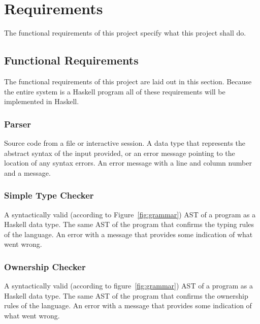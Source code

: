 \chapter{Requirements}\label{sec:reqs}
The functional requirements of this project specify what this project shall do.

\section{Functional Requirements}\label{sec:functional}
The functional requirements of this project are laid out in this section.
Because the entire system is a Haskell program all of these requirements will
be implemented in Haskell.

\subsection{Parser}\label{sec:parser}
{Source code from a file or interactive session.}
{A data type that represents the abstract syntax of the input provided, or an
error message pointing to the location of any syntax errors.}
{An error message with a line and column number and a message.}

\subsection{Simple Type Checker}\label{sec:typecheck}
 {A
syntactically valid (according to Figure~\ref{fig:grammar}) AST of a program as
a Haskell data type.} {The same AST of the program that confirms the typing
rules of the language.} {An error with a message that provides some indication
of what went wrong.}

\subsection{Ownership Checker}\label{sec:owncheck}
 {A syntactically valid (according to figure~\ref{fig:grammar}) AST
of a program as a Haskell data type.} {The same AST of the program that
confirms the ownership rules of the language.} {An error with a message that
provides some indication of what went wrong.}

